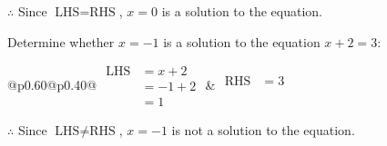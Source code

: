 \documentclass[12pt]{article}
\newcounter{minipagecount}
\begin{document}
\begin{multicols}{2}
\begin{minipage}[t]{0.40\textwidth}
    \noindent \(\therefore\) Since \(\text{LHS} = \text{RHS}\), \(x = 0\) is  a solution to the equation.

\end{minipage}

\vspace*{0.5ex}
\vfill{}
\noindent{(\theminipagecount)}\hspace{0.1mm} %
\begin{minipage}[t]{0.40\textwidth} %

    \noindent Determine whether \(x = -1\) is a solution to the equation \(x + 2 = 3\):
    \vspace{2pt}  %

    \noindent
    \renewcommand{\arraystretch}{1.3} %
    \begin{tabular}{@{}p{0.60\linewidth}@{}p{0.40\linewidth}@{}}
        \(\begin{aligned}
            \text{LHS} &= x + 2 \\
                    &= -1 + 2 \\
                    &= 1 
        \end{aligned}\) &
        \(\begin{aligned}
            \text{RHS} &= 3\\
                    & \\
                    &
        \end{aligned}\)
    \end{tabular}
    \renewcommand{\arraystretch}{1.0} %
    \vspace{2pt}  %

    \noindent \(\therefore\) Since \(\text{LHS} \neq \text{RHS}\), \(x = -1\) is not  a solution to the equation.

\end{minipage}

\vspace*{0.5ex}
\vfill{}
\columnbreak
\noindent{(\theminipagecount)}\hspace{0.1mm} %
\begin{minipage}[t]{0.40\textwidth} %


\end{minipage}
\end{multicols}
\end{document}
